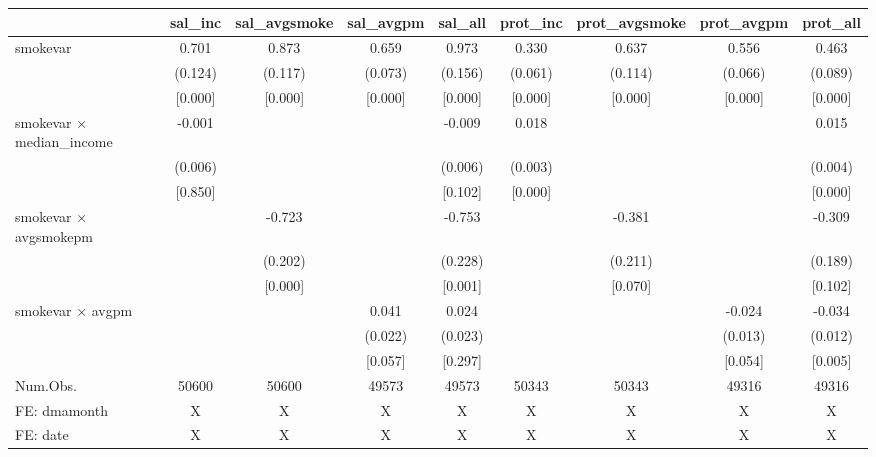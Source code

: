 \begin{table}
\centering
\begin{tabular}[t]{lcccccccc}
\toprule
  & sal\_inc & sal\_avgsmoke & sal\_avgpm & sal\_all & prot\_inc & prot\_avgsmoke & prot\_avgpm & prot\_all\\
\midrule
smokevar & 0.701 & 0.873 & 0.659 & 0.973 & 0.330 & 0.637 & 0.556 & 0.463\\
 & (0.124) & (0.117) & (0.073) & (0.156) & (0.061) & (0.114) & (0.066) & (0.089)\\
 & {}[0.000] & {}[0.000] & {}[0.000] & {}[0.000] & {}[0.000] & {}[0.000] & {}[0.000] & {}[0.000]\\
smokevar × median\_income & -0.001 &  &  & -0.009 & 0.018 &  &  & 0.015\\
 & (0.006) &  &  & (0.006) & (0.003) &  &  & (0.004)\\
 & {}[0.850] &  &  & {}[0.102] & {}[0.000] &  &  & {}[0.000]\\
smokevar × avgsmokepm &  & -0.723 &  & -0.753 &  & -0.381 &  & -0.309\\
 &  & (0.202) &  & (0.228) &  & (0.211) &  & (0.189)\\
 &  & {}[0.000] &  & {}[0.001] &  & {}[0.070] &  & {}[0.102]\\
smokevar × avgpm &  &  & 0.041 & 0.024 &  &  & -0.024 & -0.034\\
 &  &  & (0.022) & (0.023) &  &  & (0.013) & (0.012)\\
 &  &  & {}[0.057] & {}[0.297] &  &  & {}[0.054] & {}[0.005]\\
\midrule
Num.Obs. & 50600 & 50600 & 49573 & 49573 & 50343 & 50343 & 49316 & 49316\\
FE: dmamonth & X & X & X & X & X & X & X & X\\
FE: date & X & X & X & X & X & X & X & X\\
\bottomrule
\end{tabular}
\end{table}
